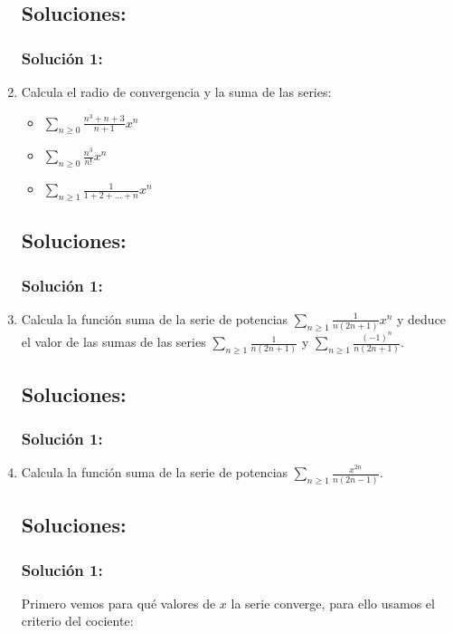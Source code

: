\documentclass[a4paper, 11pt]{article} %
\begin{document}
\begin{enumerate}
	\subsection*{Soluciones:}
		\subsubsection*{Solución 1:}
	
	\item Calcula el radio de convergencia y la suma de las series:
	\begin{itemize}
		\item $\displaystyle{\sum_{n \geq 0} \frac{n^3+n+3}{n+1}x^n}$
		\item $\displaystyle{\sum_{n \geq 0} \frac{n^3}{n!}x^n}$
		\item $\displaystyle{\sum_{n \geq 1} \frac{1}{1 + 2 + \dots + n}x^n}$
	\end{itemize}
	\subsection*{Soluciones:}
		\subsubsection*{Solución 1:}
	
	\item Calcula la función suma de la serie de potencias $\displaystyle{\sum_{n \geq 1} \frac{1}{n(2n+1)}x^n}$ y
	deduce el valor de las sumas de las series $\displaystyle{\sum_{n \geq 1} \frac{1}{n(2n+1)}}$ y
	$\displaystyle{\sum_{n \geq 1} \frac{(-1)^n}{n(2n+1)}}$.
	\subsection*{Soluciones:}
		\subsubsection*{Solución 1:}
	
	\item Calcula la función suma de la serie de potencias $\displaystyle{\sum_{n \geq 1} \frac{x^{2n}}{n(2n-1)}}$.
	\subsection*{Soluciones:}
		\subsubsection*{Solución 1:}
	Primero vemos para qué valores de $x$ la serie converge, para ello usamos el criterio del cociente:
	

\end{enumerate}
\end{document}
